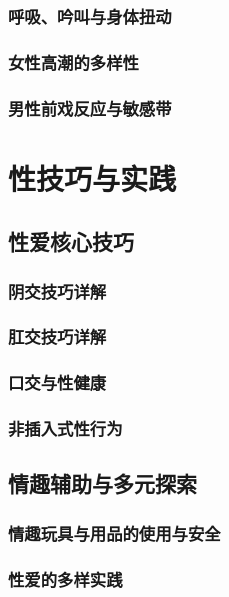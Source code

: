 \documentclass[12pt,UTF8]{ctexbook}
\begin{document}
\section{呼吸、吟叫与身体扭动}
\section{女性高潮的多样性}
\section{男性前戏反应与敏感带}

\part{性技巧与实践}

\chapter{性爱核心技巧}

\section{阴交技巧详解}

\section{肛交技巧详解}

\section{口交与性健康}
\section{非插入式性行为}

\chapter{情趣辅助与多元探索}
\section{情趣玩具与用品的使用与安全}

\section{性爱的多样实践}
\end{document}
